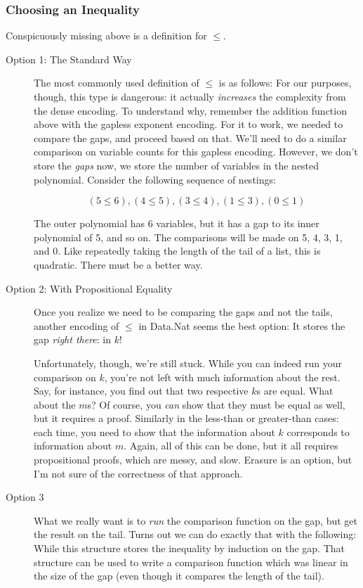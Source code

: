 \documentclass[draft, twocolumn]{article}
\theoremstyle{definition}
\begin{document}
\subsubsection{Choosing an Inequality}
Conspicuously missing above is a definition for \(\leq\).
\begin{description}
  \item[Option 1: The Standard Way] The most commonly used definition of
    \(\leq\) is as follows:
    For our purposes, though, this type is dangerous: it actually
    \emph{increases} the complexity from the dense encoding. To understand why,
    remember the addition function above with the gapless exponent encoding. For
    it to work, we needed to compare the gaps, and proceed based on that. We'll
    need to do a similar comparison on variable counts for this gapless
    encoding. However, we don't store the \emph{gaps} now, we store the number
    of variables in the nested polynomial. Consider the following sequence of
    nestings:

    \[ (5 ≤ 6), (4 ≤ 5), (3 ≤ 4), (1 ≤ 3), (0 ≤ 1) \]

    The outer polynomial has 6 variables, but it has a gap to its inner
    polynomial of 5, and so on. The comparisons will be made on 5, 4, 3, 1, and
    0. Like repeatedly taking the length of the tail of a list, this is
    quadratic. There must be a better way.
  \item[Option 2: With Propositional Equality] Once you realize we need to be
    comparing the gaps and not the tails, another encoding of \(\leq\) in
    Data.Nat seems the best option:
    It stores the gap \emph{right there}: in \(k\)!

    Unfortunately, though, we're still stuck. While you can indeed run your
    comparison on \(k\), you're not left with much information about the rest.
    Say, for instance, you find out that two respective \(k\)s are equal. What
    about the \(m\)s? Of course, you \emph{can} show that they must be equal as
    well, but it requires a proof. Similarly in the less-than or greater-than
    cases: each time, you need to show that the information about \(k\)
    corresponds to information about \(m\). Again, all of this can be done, but
    it all requires propositional proofs, which are messy, and slow. Erasure is
    an option, but I'm not sure of the correctness of that approach.
  \item[Option 3] What we really want is to \emph{run} the comparison function
    on the gap, but get the result on the tail. Turns out we can do exactly that
    with the following:
    While this structure stores the inequality by induction on the gap. That
    structure can be used to write a comparison function which was linear in the
    size of the gap (even though it compares the length of the tail).

\end{description}
\end{document}
